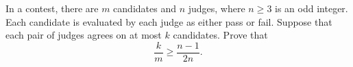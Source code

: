 In a contest, there are $m$ candidates and $n$ judges, where $n\geq 3$
 is an odd integer. Each candidate is evaluated by each judge as either 
pass or fail. Suppose that each pair of judges agrees on at most $k$ candidates. Prove that \[{\frac{k}{m}} \geq {\frac{n-1}{2n}}. \]
